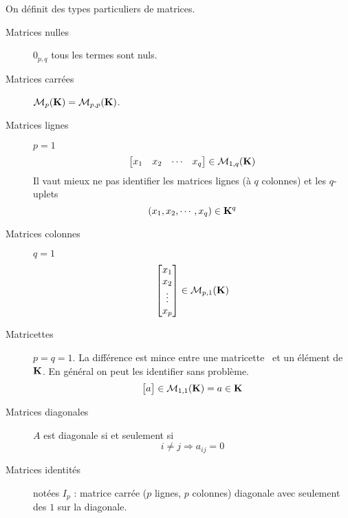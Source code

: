 On définit des types particuliers de matrices.
\begin{description}
  \item[Matrices nulles] $0_{p,q}$ tous les termes sont nuls.

  \item [Matrices carrées]$\mathcal M_{p}(\mathbf{K})=\mathcal M_{p,p}(\mathbf{K})$. 

  \item [Matrices lignes] $p=1$ 
\begin{displaymath}
  \begin{bmatrix}
  x_{1}& x_{2} & \cdots & x_{q} 
 \end{bmatrix} \in \mathcal M_{1,q}(\mathbf{K})
\end{displaymath}
Il vaut mieux ne pas identifier les matrices lignes (à $q$ colonnes) et les $q$-uplets
\begin{displaymath}
  (x_{1}, x_{2}, \cdots , x_{q}) \in \mathbf{K}^q
\end{displaymath}

  \item [Matrices colonnes] $q=1$ 
\begin{displaymath}
  \begin{bmatrix}
  x_{1} \\ x_{2} \\ \vdots \\ x_{p} 
 \end{bmatrix} \in \mathcal M_{p,1}(\mathbf{K})
\end{displaymath}

  \item [\og Matricettes\fg] $p=q=1$.  La différence est mince entre une \og matricette\fg~ et un élément de $\mathbf{K}$. En général on peut les identifier sans problème.
\begin{displaymath}
  \begin{bmatrix}
  a  
 \end{bmatrix} \in \mathcal M_{1,1}(\mathbf{K}) = a \in \mathbf{K}
\end{displaymath}

  \item [Matrices diagonales]  $A$ est diagonale si et seulement si
\begin{displaymath}
 i\neq j \Rightarrow a_{ij}=0
\end{displaymath}

  \item[Matrices identités] notées $I_p$ : matrice carrée ($p$ lignes, $p$ colonnes) diagonale avec seulement des $1$ sur la diagonale.
  

\end{description}
